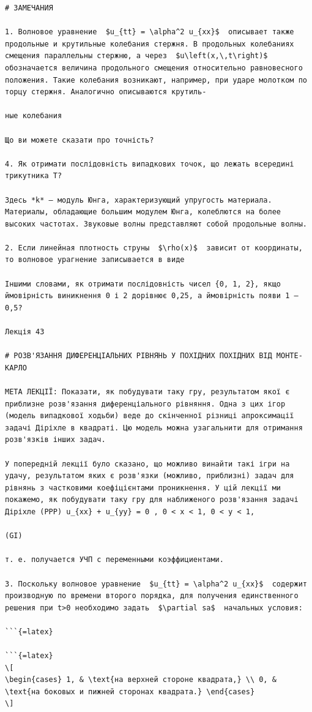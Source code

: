 \documentclass[
  ukrainian,
]{article}
\begin{document}
\begin{verbatim}
# ЗАМЕЧАНИЯ

1. Волновое уравнение  $u_{tt} = \alpha^2 u_{xx}$  описывает также продольные и крутильные колебания стержня. В продольных колебаниях смещения параллельны стержню, а через  $u\left(x,\,t\right)$  обозначается величина продольного смещения относительно равновесного положения. Такие колебания возникают, например, при ударе молотком по торцу стержня. Аналогично описываются крутиль-

ные колебания

Що ви можете сказати про точність?

4. Як отримати послідовність випадкових точок, що лежать всередині трикутника T?

Здесь *k* — модуль Юнга, характеризующий упругость материала. Материалы, обладающие большим модулем Юнга, колеблются на более высоких частотах. Звуковые волны представляют собой продольные волны.

2. Если линейная плотность струны  $\rho(x)$  зависит от координаты, то волновое урагнение записывается в виде

Іншими словами, як отримати послідовність чисел {0, 1, 2}, якщо ймовірність виникнення 0 і 2 дорівнює 0,25, а ймовірність появи 1 — 0,5?

Лекція 43

# РОЗВ'ЯЗАННЯ ДИФЕРЕНЦІАЛЬНИХ РІВНЯНЬ У ПОХІДНИХ ПОХІДНИХ ВІД МОНТЕ-КАРЛО

МЕТА ЛЕКЦІЇ: Показати, як побудувати таку гру, результатом якої є приблизне розв'язання диференціального рівняння. Одна з цих ігор (модель випадкової ходьби) веде до скінченної різниці апроксимації задачі Діріхле в квадраті. Цю модель можна узагальнити для отримання розв'язків інших задач.

У попередній лекції було сказано, що можливо винайти такі ігри на удачу, результатом яких є розв'язки (можливо, приблизні) задач для рівнянь з частковими коефіцієнтами проникнення. У цій лекції ми покажемо, як побудувати таку гру для наближеного розв'язання задачі Діріхле (PPP) u_{xx} + u_{yy} = 0 , 0 < x < 1, 0 < y < 1,

(GI)

т. е. получается УЧП с переменными коэффициентами.

3. Поскольку волновое уравнение  $u_{tt} = \alpha^2 u_{xx}$  содержит производную по времени второго порядка, для получения единственного решения при t>0 необходимо задать  $\partial sa$  начальных условия:

```{=latex}

```{=latex}
\[
\begin{cases} 1, & \text{на верхней стороне квадрата,} \\ 0, & \text{на боковых и пижней сторонах квадрата.} \end{cases}
\]
\end{verbatim}
\end{document}
